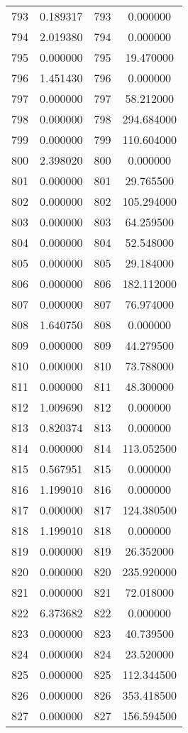 \documentclass[12pt]{article}
\begin{document}
\begin{longtable}{@{}cccc@{}}
793 & 0.189317 & 793 & 0.000000 \\
794 & 2.019380 & 794 & 0.000000 \\
795 & 0.000000 & 795 & 19.470000 \\
796 & 1.451430 & 796 & 0.000000 \\
797 & 0.000000 & 797 & 58.212000 \\
798 & 0.000000 & 798 & 294.684000 \\
799 & 0.000000 & 799 & 110.604000 \\
800 & 2.398020 & 800 & 0.000000 \\
801 & 0.000000 & 801 & 29.765500 \\
802 & 0.000000 & 802 & 105.294000 \\
803 & 0.000000 & 803 & 64.259500 \\
804 & 0.000000 & 804 & 52.548000 \\
805 & 0.000000 & 805 & 29.184000 \\
806 & 0.000000 & 806 & 182.112000 \\
807 & 0.000000 & 807 & 76.974000 \\
808 & 1.640750 & 808 & 0.000000 \\
809 & 0.000000 & 809 & 44.279500 \\
810 & 0.000000 & 810 & 73.788000 \\
811 & 0.000000 & 811 & 48.300000 \\
812 & 1.009690 & 812 & 0.000000 \\
813 & 0.820374 & 813 & 0.000000 \\
814 & 0.000000 & 814 & 113.052500 \\
815 & 0.567951 & 815 & 0.000000 \\
816 & 1.199010 & 816 & 0.000000 \\
817 & 0.000000 & 817 & 124.380500 \\
818 & 1.199010 & 818 & 0.000000 \\
819 & 0.000000 & 819 & 26.352000 \\
820 & 0.000000 & 820 & 235.920000 \\
821 & 0.000000 & 821 & 72.018000 \\
822 & 6.373682 & 822 & 0.000000 \\
823 & 0.000000 & 823 & 40.739500 \\
824 & 0.000000 & 824 & 23.520000 \\
825 & 0.000000 & 825 & 112.344500 \\
826 & 0.000000 & 826 & 353.418500 \\
827 & 0.000000 & 827 & 156.594500 \\

\end{longtable}
\end{document}
